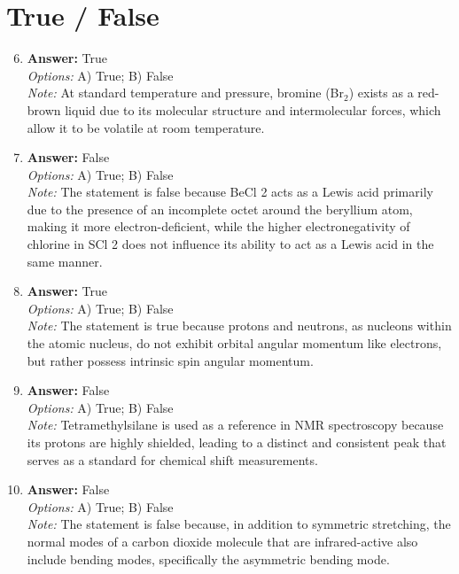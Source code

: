 \documentclass[12pt]{article}
\begin{document}
\section*{True / False}
\begin{enumerate}[label=\arabic*.]
\setcounter{enumi}{5}
\item \textbf{Answer:} True
\\ \textit{Options:} A) True; B) False
\\ \textit{Note:} At standard temperature and pressure, bromine (Br$_{2}$) exists as a red-brown liquid due to its molecular structure and intermolecular forces, which allow it to be volatile at room temperature.
\item \textbf{Answer:} False
\\ \textit{Options:} A) True; B) False
\\ \textit{Note:} The statement is false because BeCl 2 acts as a Lewis acid primarily due to the presence of an incomplete octet around the beryllium atom, making it more electron-deficient, while the higher electronegativity of chlorine in SCl 2 does not influence its ability to act as a Lewis acid in the same manner.
\item \textbf{Answer:} True
\\ \textit{Options:} A) True; B) False
\\ \textit{Note:} The statement is true because protons and neutrons, as nucleons within the atomic nucleus, do not exhibit orbital angular momentum like electrons, but rather possess intrinsic spin angular momentum.
\item \textbf{Answer:} False
\\ \textit{Options:} A) True; B) False
\\ \textit{Note:} Tetramethylsilane is used as a reference in NMR spectroscopy because its protons are highly shielded, leading to a distinct and consistent peak that serves as a standard for chemical shift measurements.
\item \textbf{Answer:} False
\\ \textit{Options:} A) True; B) False
\\ \textit{Note:} The statement is false because, in addition to symmetric stretching, the normal modes of a carbon dioxide molecule that are infrared-active also include bending modes, specifically the asymmetric bending mode.
\end{enumerate}
\end{document}

